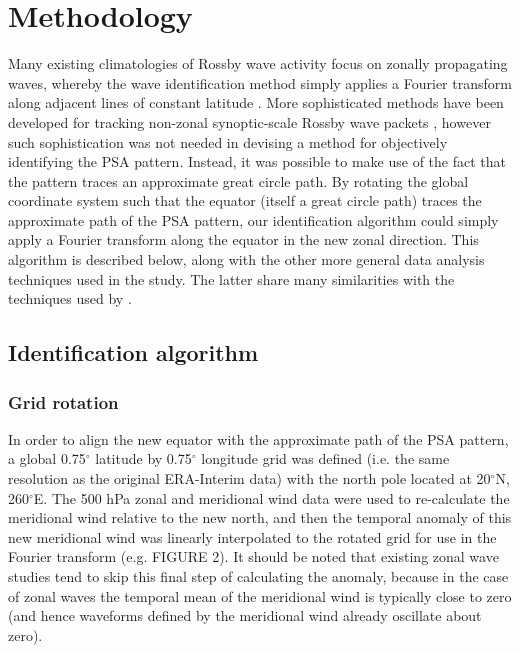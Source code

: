 \section{Methodology}

Many existing climatologies of Rossby wave activity focus on zonally propagating waves, whereby the wave identification method simply applies a Fourier transform along adjacent lines of constant latitude \citep[e.g.][]{Glatt2014,IrvingSimmonds2015}. More sophisticated methods have been developed for tracking non-zonal synoptic-scale Rossby wave packets \citep[e.g.][]{Zimin2006,Souders2014}, however such sophistication was not needed in devising a method for objectively identifying the PSA pattern. Instead, it was possible to make use of the fact that the pattern traces an approximate great circle path. By rotating the global coordinate system such that the equator (itself a great circle path) traces the approximate path of the PSA pattern, our identification algorithm could simply apply a Fourier transform along the equator in the new zonal direction. This algorithm is described below, along with the other more general data analysis techniques used in the study. The latter share many similarities with the techniques used by \citet{IrvingSimmonds2015}.

\subsection{Identification algorithm}

\subsubsection{Grid rotation}

In order to align the new equator with the approximate path of the PSA pattern, a global 0.75$^{\circ}$ latitude by 0.75$^{\circ}$ longitude grid was defined (i.e. the same resolution as the original ERA-Interim data) with the north pole located at 20$^{\circ}$N, 260$^{\circ}$E. The 500 hPa zonal and meridional wind data were used to re-calculate the meridional wind relative to the new north, and then the temporal anomaly of this new meridional wind was linearly interpolated to the rotated grid for use in the Fourier transform (e.g. FIGURE 2). It should be noted that existing zonal wave studies \citep[e.g.][]{IrvingSimmonds2015} tend to skip this final step of calculating the anomaly, because in the case of zonal waves the temporal mean of the meridional wind is typically close to zero (and hence waveforms defined by the meridional wind already oscillate about zero). 

